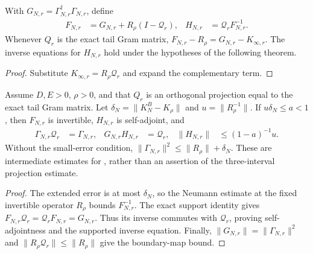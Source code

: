 \begin{definition}
    \label{def:residual_extended_gram_supported_inverse}
    \leanok
    With $G_{N,r}=\Gamma_{N,r}^\dagger\Gamma_{N,r}$, define
    \begin{align}
        F_{N,r} & =G_{N,r}+R_\rho(I-\mathcal Q_r), &
        H_{N,r} & =\mathcal Q_rF_{N,r}^{-1}.
    \end{align}
    Whenever $Q_r$ is the exact tail Gram matrix,
    $F_{N,r}-R_\rho=G_{N,r}-K_{\infty,r}$.
    The inverse equations for $H_{N,r}$ hold under the hypotheses of the
    following theorem.
\end{definition}
\begin{proof}\leanok
    Substitute $K_{\infty,r}=R_\rho\mathcal Q_r$ and expand the complementary
    term.
\end{proof}

\begin{lemma}
    \label{thm:residual_supported_inverse_small_error}
    \leanok
    Assume $D,E>0$, $\rho>0$, and that $Q_r$ is an orthogonal projection
    equal to the exact tail Gram matrix. Let
    $\delta_N=\|K_N^B-K_\rho\|$ and $u=\|R_\rho^{-1}\|$.
    If $u\delta_N\leq a<1$, then $F_{N,r}$ is invertible, $H_{N,r}$ is
    self-adjoint, and
    \begin{align}
        \Gamma_{N,r}\mathcal Q_r & =\Gamma_{N,r},   &
        G_{N,r}H_{N,r}           & =\mathcal Q_r,   &
        \|H_{N,r}\|              & \leq(1-a)^{-1}u.
    \end{align}
    Without the small-error condition,
    $\|\Gamma_{N,r}\|^2\leq\|R_\rho\|+\delta_N$.
    These are intermediate estimates for
    \cite[Lemma~commutation(ii)]{Nachtergaele1996Spectral},
    rather than an assertion of the three-interval projection estimate.
\end{lemma}
\begin{proof}\leanok
    The extended error is at most $\delta_N$, so the Neumann estimate
    at the fixed invertible operator $R_\rho$ bounds $F_{N,r}^{-1}$.
    The exact support identity gives
    $F_{N,r}\mathcal Q_r=\mathcal Q_rF_{N,r}=G_{N,r}$.
    Thus its inverse commutes with $\mathcal Q_r$, proving self-adjointness
    and the supported inverse equation. Finally,
    $\|G_{N,r}\|=\|\Gamma_{N,r}\|^2$ and
    $\|R_\rho\mathcal Q_r\|\leq\|R_\rho\|$ give the boundary-map bound.
\end{proof}

